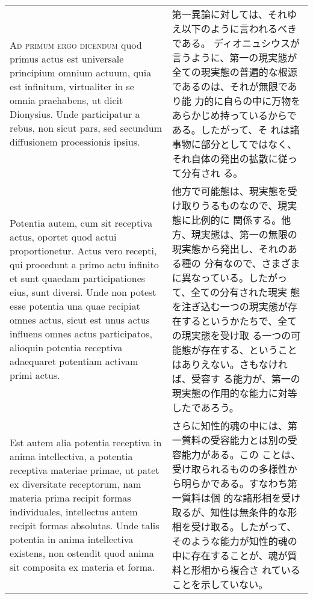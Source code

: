 \documentclass[10pt]{jsarticle} %
\begin{document}
\begin{longtable}{p{21em}p{21em}}
\\



{\scshape Ad primum ergo dicendum} quod primus actus est universale
principium omnium actuum, quia est infinitum, virtualiter in se omnia
praehabens, ut dicit Dionysius. Unde participatur a rebus, non sicut
pars, sed secundum diffusionem processionis ipsius. 



&

第一異論に対しては、それゆえ以下のように言われるべきである。
ディオニュシウスが言うように、第一の現実態が全ての現実態の普遍的な根源であるのは、それが無限であり能
 力的に自らの中に万物をあらかじめ持っているからである。したがって、そ
 れは諸事物に部分としてではなく、それ自体の発出の拡散に従って分有され
 る。

\\

Potentia autem, cum sit receptiva actus, oportet quod actui
proportionetur.  Actus vero recepti, qui procedunt a primo actu
infinito et sunt quaedam participationes eius, sunt diversi. Unde non
potest esse potentia una quae recipiat omnes actus, sicut est unus
actus influens omnes actus participatos, alioquin potentia receptiva
adaequaret potentiam activam primi actus.

&

他方で可能態は、現実態を受け取りうるものなので、現実態に比例的に
関係する。他方、現実態は、第一の無限の現実態から発出し、それのある種の
分有なので、さまざまに異なっている。したがって、全ての分有された現実
態を注ぎ込む一つの現実態が存在するというかたちで、全ての現実態を受け取
る一つの可能態が存在する、ということはありえない。さもなければ、受容す
る能力が、第一の現実態の作用的な能力に対等したであろう。


\\


Est autem alia potentia receptiva in anima intellectiva,
a potentia receptiva materiae primae, ut patet ex diversitate
receptorum, nam materia prima recipit formas individuales, intellectus
autem recipit formas absolutas. Unde talis potentia in anima
intellectiva existens, non ostendit quod anima sit composita ex
materia et forma.


&

さらに知性的魂の中には、第一質料の受容能力とは別の受容能力がある。この
ことは、受け取られるものの多様性から明らかである。すなわち第一質料は個
 的な諸形相を受け取るが、知性は無条件的な形相を受け取る。したがって、
 そのような能力が知性的魂の中に存在することが、魂が質料と形相から複合さ
 れていることを示していない。



\end{longtable}
\end{document}
